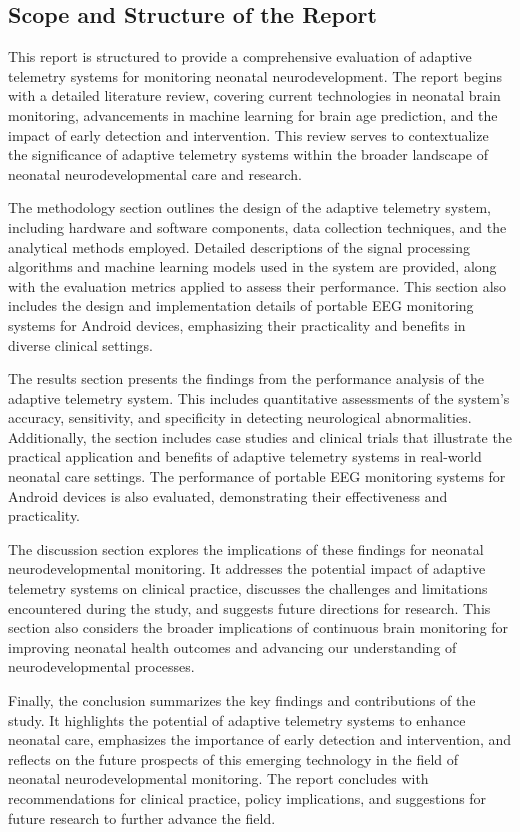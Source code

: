 \documentclass[12pt,journal,compsoc]{IEEEtran}
\begin{document}
\subsection{Scope and Structure of the Report}
This report is structured to provide a comprehensive evaluation of adaptive telemetry systems for monitoring neonatal neurodevelopment. The report begins with a detailed literature review, covering current technologies in neonatal brain monitoring, advancements in machine learning for brain age prediction, and the impact of early detection and intervention. This review serves to contextualize the significance of adaptive telemetry systems within the broader landscape of neonatal neurodevelopmental care and research.

The methodology section outlines the design of the adaptive telemetry system, including hardware and software components, data collection techniques, and the analytical methods employed. Detailed descriptions of the signal processing algorithms and machine learning models used in the system are provided, along with the evaluation metrics applied to assess their performance. This section also includes the design and implementation details of portable EEG monitoring systems for Android devices, emphasizing their practicality and benefits in diverse clinical settings.

The results section presents the findings from the performance analysis of the adaptive telemetry system. This includes quantitative assessments of the system's accuracy, sensitivity, and specificity in detecting neurological abnormalities. Additionally, the section includes case studies and clinical trials that illustrate the practical application and benefits of adaptive telemetry systems in real-world neonatal care settings. The performance of portable EEG monitoring systems for Android devices is also evaluated, demonstrating their effectiveness and practicality.

The discussion section explores the implications of these findings for neonatal neurodevelopmental monitoring. It addresses the potential impact of adaptive telemetry systems on clinical practice, discusses the challenges and limitations encountered during the study, and suggests future directions for research. This section also considers the broader implications of continuous brain monitoring for improving neonatal health outcomes and advancing our understanding of neurodevelopmental processes.

Finally, the conclusion summarizes the key findings and contributions of the study. It highlights the potential of adaptive telemetry systems to enhance neonatal care, emphasizes the importance of early detection and intervention, and reflects on the future prospects of this emerging technology in the field of neonatal neurodevelopmental monitoring. The report concludes with recommendations for clinical practice, policy implications, and suggestions for future research to further advance the field.
\end{document}
